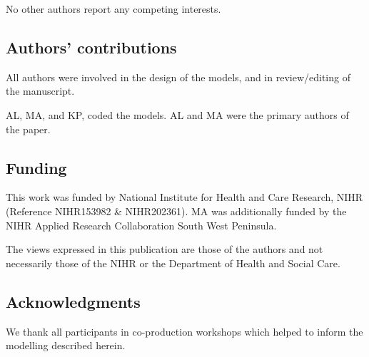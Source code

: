 No other authors report any competing interests.

\subsection{Authors' contributions}

All authors were involved in the design of the models, and in review/editing of the manuscript.

AL, MA, and KP, coded the models. AL and MA were the primary authors of the paper.


\subsection*{Funding}

This work was funded by National Institute for Health and Care Research, NIHR (Reference NIHR153982 \& NIHR202361). MA was additionally funded by the NIHR Applied Research Collaboration South West Peninsula.

The views expressed in this publication are those of the authors and not necessarily those
of the NIHR or the Department of Health and Social Care.

\subsection*{Acknowledgments}

We thank all participants in co-production workshops which helped to inform the modelling described herein.

